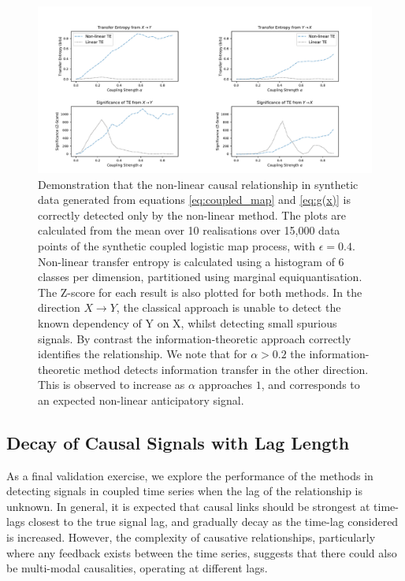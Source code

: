 \documentclass[]{rsos}%
\begin{document}
\begin{figure}[!htb]
    \includegraphics[width=\linewidth]{images/confirming_logmap.pdf}
    \caption{Demonstration that the non-linear causal relationship in synthetic data generated from equations \ref{eq:coupled_map} and \ref{eq:g(x)} is correctly detected only by the non-linear method. The plots are calculated from the mean over 10 realisations over 15,000 data points of the synthetic coupled logistic map process, with $\epsilon = 0.4$. Non-linear transfer entropy is calculated using a histogram of 6 classes per dimension, partitioned using marginal equiquantisation. The Z-score for each result is also plotted for both methods. In the direction $X \rightarrow Y$, the classical approach is unable to detect the known dependency of Y on X, whilst detecting small spurious signals. By contrast the information-theoretic approach correctly identifies the relationship.  We note that for $\alpha>0.2$ the information-theoretic method detects information transfer in the other direction. This is observed to increase as $\alpha$ approaches $1$, and corresponds to an expected non-linear anticipatory signal.
    }
    \label{fig:CLM_confirmation}
  \end{figure}

  \subsection{Decay of Causal Signals with Lag Length}
  As a final validation exercise, we explore the performance of the methods in detecting signals in coupled time series when the lag of the relationship is unknown. In general, it is expected that causal links should be strongest at time-lags closest to the true signal lag, and gradually decay as the time-lag considered is increased. However, the complexity of causative relationships, particularly where any feedback exists between the time series, suggests that there could also be multi-modal causalities, operating at different lags.  
\end{document}
